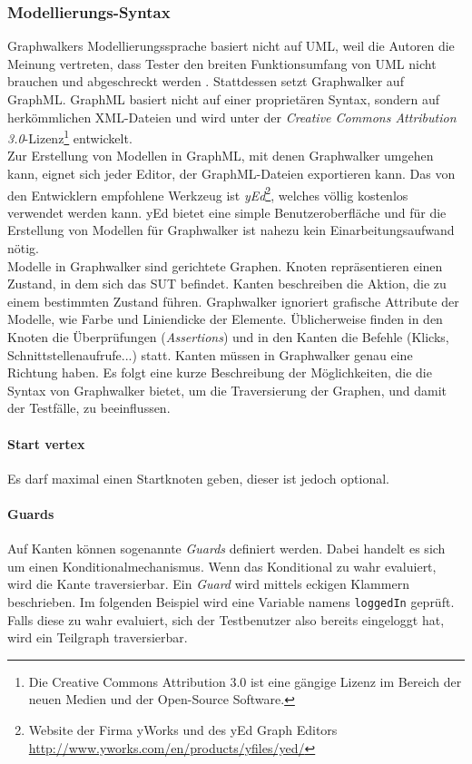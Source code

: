 \subsubsection{Modellierungs-Syntax}
Graphwalkers Modellierungssprache basiert nicht auf UML, weil die Autoren die Meinung vertreten, dass Tester den breiten Funktionsumfang von \Gls{UML} nicht brauchen und abgeschreckt werden \cite{_graphwalker_2015}. Stattdessen setzt Graphwalker auf GraphML. GraphML basiert nicht auf einer proprietären Syntax, sondern auf herkömmlichen XML-Dateien und wird unter der \textit{Creative Commons Attribution 3.0}-Lizenz\footnote{Die Creative Commons Attribution 3.0 ist eine gängige Lizenz im Bereich der neuen Medien und der Open-Source Software.} entwickelt.\\
Zur Erstellung von Modellen in GraphML, mit denen Graphwalker umgehen kann, eignet sich jeder Editor, der GraphML-Dateien exportieren kann. Das von den Entwicklern empfohlene Werkzeug ist \textit{yEd}\footnote{Website der Firma yWorks und des yEd Graph Editors \url{http://www.yworks.com/en/products/yfiles/yed/}}, welches völlig kostenlos verwendet werden kann. yEd bietet eine simple Benutzer\-ober\-fläche und für die Erstellung von Modellen für Graphwalker ist nahezu kein Einarbeitungsaufwand nötig.\\
Modelle in Graphwalker sind gerichtete Graphen. Knoten repräsentieren einen Zustand, in dem sich das \Gls{SUT} befindet. Kanten beschreiben die Aktion, die zu einem bestimmten Zustand führen. Graphwalker ignoriert grafische Attribute der Modelle, wie Farbe und Liniendicke der Elemente. Üblicherweise finden in den Knoten die Überprüfungen (\textit{Assertions}) und in den Kanten die Befehle (Klicks, Schnittstellenaufrufe...) statt. Kanten müssen in Graphwalker genau eine Richtung haben. Es folgt eine kurze Beschreibung der Möglichkeiten, die die Syntax von Graphwalker bietet, um die Traversierung der Graphen, und damit der Testfälle, zu beeinflussen.

\paragraph{Start vertex} Es darf maximal einen Startknoten geben, dieser ist jedoch optional.

\paragraph{Guards} Auf Kanten können sogenannte \textit{Guards} definiert werden. Dabei handelt es sich um einen Konditionalmechanismus. Wenn das Konditional zu wahr evaluiert, wird die Kante traversierbar. Ein \textit{Guard} wird mittels eckigen Klammern beschrieben. Im folgenden Beispiel wird eine Variable namens \texttt{loggedIn} geprüft. Falls diese zu wahr evaluiert, sich der Testbenutzer also bereits eingeloggt hat, wird ein Teilgraph traversierbar.

